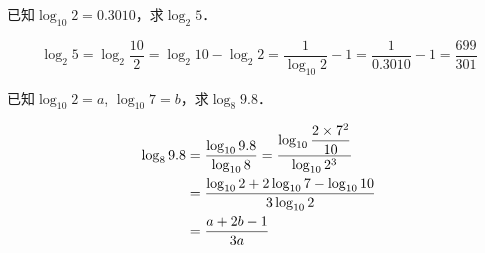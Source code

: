 \begin{example}
已知$\log_{10}2=0.3010$，求$\log_2 5$．
\end{example}

\begin{solution}
\[\log_2 5=\log_2 \frac{10}{2}=\log_2 10-\log_2 2=\frac{1}{\log_{10}2}-1=\frac{1}{0.3010}-1=\frac{699}{301}\] 
\end{solution}    

\begin{example}
    已知$\log_{10}2=a$, $\log_{10}7=b$，求$\log_{8}9.8$．
\end{example}

\begin{solution}
\[\begin{split}
    \log_{8}9.8&=\dfrac{\log_{10}9.8}{\log_{10}8}=\dfrac{\log_{10}\dfrac{2\times 7^2}{10}}{\log_{10}2^3}\\
    &=\dfrac{\log_{10}2+2\log_{10}7-\log_{10}10}{3\log_{10}2}\\
    &=\dfrac{a+2b-1}{3a}
\end{split}\]
\end{solution}

